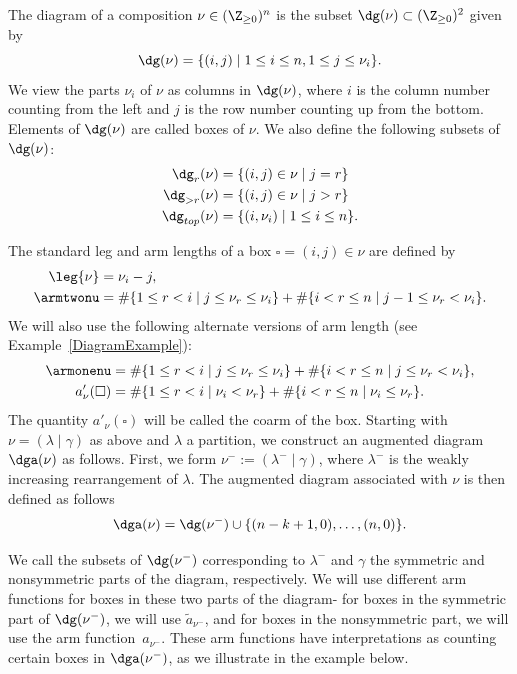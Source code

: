 The diagram of a composition $\nu\in(\Z_{\ge 0})^n$ is the subset $\dg(\nu)\subset (\Z_{\ge 0})^2$ given by
$$ \dg(\nu)=\{(i,j) \mid 1\le i\le n, 1\le j\le\nu_i\}. $$
We view the parts $\nu_i$ of $\nu$ as columns in $\dg(\nu)$, where $i$ is the column number counting from the left and $j$ is the row number counting up from the bottom. Elements of $\dg(\nu)$ are called boxes of $\nu$. We also define the following subsets of $\dg(\nu)$:
\begin{align*} 
\dg_r(\nu) &= \{(i,j) \in \nu \mid j=r \} \\
\dg_{>r}(\nu) &= \{(i,j) \in \nu \mid j>r\} \\
\dg_{top}(\nu) &= \{(i,\nu_i) \mid 1 \leq i \leq n\}.
\end{align*}




The standard leg and arm lengths of a box $\square=(i,j)\in\nu$ are defined by
\begin{align*}
\leg{\nu} &= \nu_i -j,\\
\armtwonu &= \# \{ 1 \leq r < i \mid j\leq \nu_r \leq \nu_i\} + \# \{ i<r \leq n \mid j-1\leq \nu_r < \nu_i\}.
\end{align*}
We will also use the following alternate versions of arm length (see Example~\ref{DiagramExample}):
\begin{align*}
\armonenu &= \# \{1\leq r < i \mid j \leq \nu_r \leq \nu_i \} + \# \{i<r \leq n \mid j \leq \nu_r < \nu_i \}, \\
a'_\nu(\square) &= \# \{1\leq r<i \mid \nu_i < \nu_r \} + \# \{i<r \leq n \mid \nu_i \leq \nu_r \}.\end{align*}
The quantity $a'_\nu(\square)$ will be called the coarm of the box. Starting with $\nu=(\lambda \mid \gamma)$ as above and $\lambda$ a partition, we construct an augmented diagram $\dga(\nu)$ as follows. First, we form $\nu^- := (\lambda^- \mid \gamma)$, where $\lambda^-$ is the weakly increasing rearrangement of $\lambda$. The augmented diagram associated with $\nu$ is then defined as follows
\[ \dga(\nu)=\dg(\nu^-)\cup \{(n-k+1,0),\dotsc,(n,0)\}. \]

We call the subsets of $\dg(\nu^-)$ corresponding to $\lambda^-$ and $\gamma$ the symmetric and nonsymmetric parts of the diagram, respectively. We will use different arm functions for boxes in these two parts of the diagram- for boxes in the symmetric part of $\dg(\nu^-)$, we will use $\widetilde{a}_{\nu^-}$, and for boxes in the nonsymmetric part, we will use the arm function~$a_{\nu^-}$. These arm functions have interpretations as counting certain boxes in $\dga(\nu^-)$, as we illustrate in the example below. 



